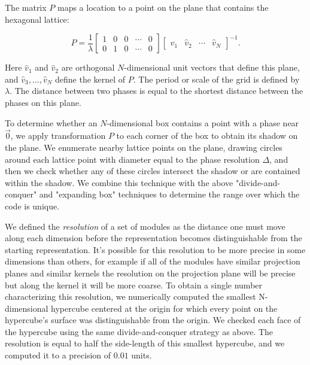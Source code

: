 \documentclass[12pt]{article}
\begin{document}
The matrix $P$ maps a location to a point on the plane that contains the hexagonal lattice:

\begin{equation}
P =
\frac{1}{\lambda}
\begin{bmatrix}
1 & 0 & 0 & \cdots & 0 \\
0 & 1 & 0 & \cdots & 0
\end{bmatrix}
\begin{bmatrix}
\hat{v}_1 & \hat{v}_2 & \cdots & \hat{v}_N
\end{bmatrix}^{-1}.
\end{equation}

Here $\hat{v}_1$ and $\hat{v}_2$ are orthogonal $N$-dimensional unit vectors that define this plane, and $\hat{v}_3,\ldots,\hat{v}_N$ define the kernel of $P$.
The period or scale of the grid is defined by $\lambda$. The distance between two phases is equal to the shortest distance between the phases on this plane.

To determine whether an $N$-dimensional box contains a point with a phase near $\vec{0}$, we apply transformation $P$ to each corner of the box to obtain its shadow on the plane. We enumerate nearby lattice points on the plane, drawing circles around each lattice point with diameter equal to the phase resolution $\Delta$, and then we check whether any of these circles intersect the shadow or are contained within the shadow. We combine this technique with the above "divide-and-conquer" and "expanding box" techniques to determine the range over which the code is unique.

We defined the \textit{resolution} of a set of modules as the distance one must move along each dimension before the representation becomes distinguishable from the starting representation. It's possible for this resolution to be more precise in some dimensions than others, for example if all of the modules have similar projection planes and similar kernels the resolution on the projection plane will be precise but along the kernel it will be more coarse. To obtain a single number characterizing this resolution, we numerically computed the smallest N-dimensional hypercube centered at the origin for which every point on the hypercube's surface was distinguishable from the origin. We checked each face of the hypercube using the same divide-and-conquer strategy as above. The resolution is equal to half the side-length of this smallest hypercube, and we computed it to a precision of $0.01$ units.
%
\end{document}
